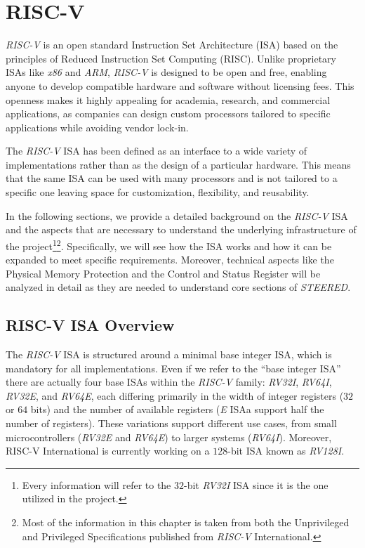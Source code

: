 \chapter{RISC-V}
\label{cha:riscv}

\textit{RISC-V} is an open standard Instruction Set Architecture (ISA) based on the
principles of Reduced Instruction Set Computing (RISC). Unlike proprietary ISAs
like \textit{x86} and \textit{ARM}, \textit{RISC-V} is designed to be open and
free, enabling anyone to develop compatible hardware and software without licensing
fees. This openness makes it highly appealing for academia, research, and
commercial applications, as companies can design custom processors tailored to specific
applications while avoiding vendor lock-in.

The \textit{RISC-V} ISA has been defined as an interface to a wide variety of
implementations rather than as the design of a particular hardware. This means that
the same ISA can be used with many processors and is not tailored to a specific one
leaving space for customization, flexibility, and reusability.

In the following sections, we provide a detailed background on the \textit{RISC-V}
ISA and the aspects that are necessary to understand the underlying infrastructure
of the project\footnote{Every information will refer to the $32$-bit \textit{RV32I}
ISA since it is the one utilized in the project.}\footnote{Most of the
information in this chapter is taken from both the Unprivileged and Privileged
Specifications\cite{specifications} published from \textit{RISC-V} International.}.
Specifically, we will see how the ISA works and how it can be expanded to meet specific
requirements. Moreover, technical aspects like the Physical Memory Protection and
the Control and Status Register will be analyzed in detail as they are needed to
understand core sections of \textit{STEERED}.

\section{RISC-V ISA Overview}
\label{sec:riscv_isa}

The \textit{RISC-V} ISA is structured around a minimal base integer ISA, which is
mandatory for all implementations. Even if we refer to the ``base integer ISA''
there are actually four base ISAs within the \textit{RISC-V} family: \textit{RV32I},
\textit{RV64I}, \textit{RV32E}, and \textit{RV64E}, each differing primarily in
the width of integer registers ($32$ or $64$ bits) and the number of available
registers (\textit{E} ISAa support half the number of registers). These
variations support different use cases, from small microcontrollers (\textit{RV32E}
and \textit{RV64E}) to larger systems (\textit{RV64I}). Moreover, RISC-V
International is currently working on a $128$-bit ISA known as \textit{RV128I}.

